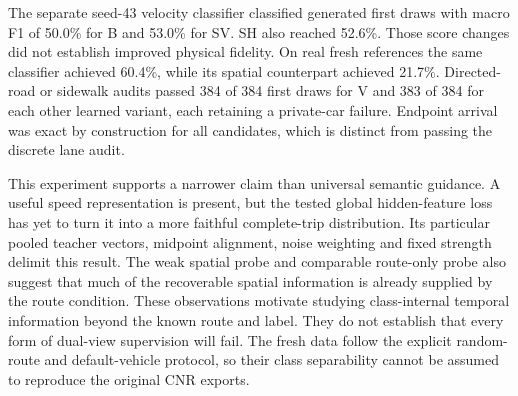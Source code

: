 
The separate seed-43 velocity classifier classified generated first draws with macro F1 of 50.0\% for B and 53.0\% for SV. SH also reached 52.6\%. Those score changes did not establish improved physical fidelity. On real fresh references the same classifier achieved 60.4\%, while its spatial counterpart achieved 21.7\%. Directed-road or sidewalk audits passed 384 of 384 first draws for V and 383 of 384 for each other learned variant, each retaining a private-car failure. Endpoint arrival was exact by construction for all candidates, which is distinct from passing the discrete lane audit.

This experiment supports a narrower claim than universal semantic guidance. A useful speed representation is present, but the tested global hidden-feature loss has yet to turn it into a more faithful complete-trip distribution. Its particular pooled teacher vectors, midpoint alignment, noise weighting and fixed strength delimit this result. The weak spatial probe and comparable route-only probe also suggest that much of the recoverable spatial information is already supplied by the route condition. These observations motivate studying class-internal temporal information beyond the known route and label. They do not establish that every form of dual-view supervision will fail. The fresh data follow the explicit random-route and default-vehicle protocol, so their class separability cannot be assumed to reproduce the original CNR exports.
